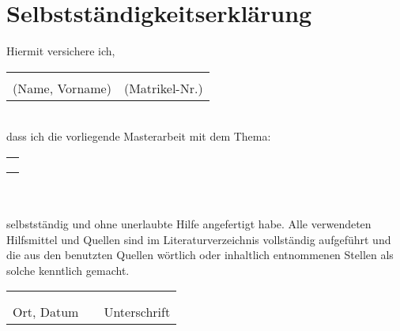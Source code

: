 \newpage

\thispagestyle{empty}
\chapter*{Selbstständigkeitserklärung}
\vspace{15mm}
 
Hiermit versichere ich, \\[0.5cm]
\begin{tabularx}{\textwidth}{p{8cm}p{5cm}}
\dotfill & \dotfill \\
(Name, Vorname) & (Matrikel-Nr.)
\end{tabularx} \\


dass ich die vorliegende Masterarbeit mit dem Thema:\\[0.5cm]
\begin{tabularx}{\textwidth}{X}
\dotfill \\[0.5cm]
\dotfill \\[0.5cm]
\dotfill 
\end{tabularx} \\ \\
selbstständig und ohne unerlaubte Hilfe angefertigt habe. Alle verwendeten Hilfsmittel und Quellen sind im Literaturverzeichnis vollständig aufgeführt und die aus den benutzten Quellen wörtlich oder inhaltlich entnommenen Stellen als solche kenntlich gemacht.

\vspace{2cm}

\begin{tabular}{lp{2em}l}
 \hspace{6cm} && \hspace{7cm} \\ \cline{1-1}\cline{3-3} \\
 Ort, Datum && Unterschrift
\end{tabular}